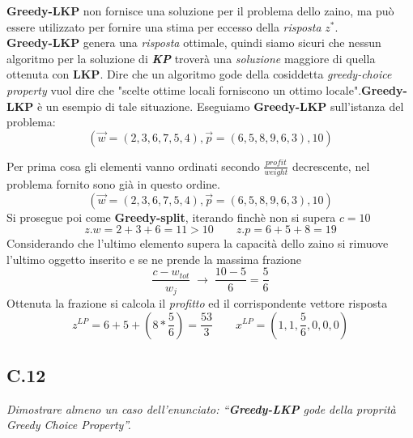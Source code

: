 \documentclass[a4paper]{article}
\newcommand{\imp}[1]{\textbf{\textit{#1}}}
\begin{document}
\textbf{Greedy-LKP} non fornisce una soluzione per il problema dello zaino, ma può essere utilizzato per fornire una stima per eccesso della \emph{risposta} $z^*$.\\
\textbf{Greedy-LKP} genera una \emph{risposta} ottimale, quindi siamo sicuri che nessun algoritmo per la soluzione di \imp{KP} troverà una \textit{soluzione} maggiore di quella ottenuta con \textbf{LKP}.
Dire che un algoritmo gode della cosiddetta \textit{greedy-choice property} vuol dire che "scelte ottime locali forniscono un ottimo locale".\textbf{Greedy-LKP} è un esempio di tale situazione.
Eseguiamo \textbf{Greedy-LKP} sull'istanza del problema: $$(\vec w = (2, 3, 6, 7, 5, 4), \vec p = (6, 5, 8, 9, 6, 3), 10)$$
\begin{adjustwidth}{.8cm}{0cm}
	Per prima cosa gli elementi vanno ordinati secondo $\frac{profit}{weight}$ decrescente, nel problema fornito sono già in questo ordine. 
	$$(\vec w = (2, 3, 6, 7, 5, 4), \vec p = (6, 5, 8, 9, 6, 3), 10)$$
	Si prosegue poi come \textbf{Greedy-split}, iterando finchè non si supera $c=10$
	$$ z.w = 2 + 3 + 6 = 11 > 10 \qquad z.p= 6 + 5 + 8 = 19$$
	Considerando che l'ultimo elemento supera la capacità dello zaino si rimuove l'ultimo oggetto inserito e se ne prende la massima frazione
	$$ \frac{c - w_{tot}}{w_j} \; \rightarrow \; \frac{10 - 5}{6} = \frac{5}{6}$$
	Ottenuta la frazione si calcola il \textit{profitto} ed il corrispondente vettore risposta
	$$ z^{LP}= 6 + 5 + (8 * \frac{5}{6} ) = \frac{53}{3} \qquad x^{LP} = (1,1,\frac{5}{6},0,0,0) $$
\end{adjustwidth}
\subsection{C.12}
\emph{Dimostrare almeno un caso dell’enunciato: “\textbf{Greedy-LKP} gode della proprità Greedy Choice Property”.}
\end{document}
